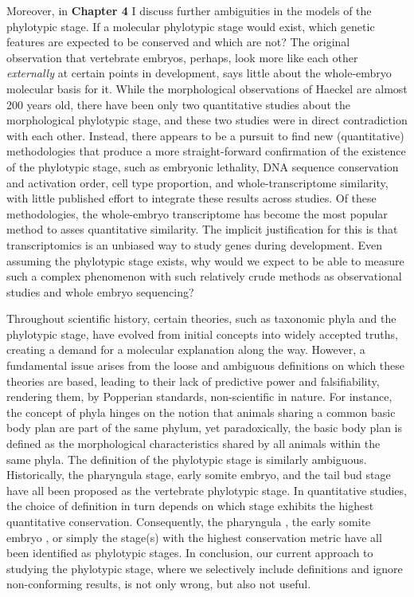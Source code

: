 Moreover, in \textbf{Chapter 4} I discuss further ambiguities in the models of the phylotypic stage. If a molecular phylotypic stage would exist, which genetic features are expected to be conserved and which are not? The original observation that vertebrate embryos, perhaps, look more like each other \textit{externally} at certain points in development, says little about the whole-embryo molecular basis for it. While the morphological observations of Haeckel are almost 200 years old, there have been only two quantitative studies about the morphological phylotypic stage, and these two studies were in direct contradiction with each other. Instead, there appears to be a pursuit to find new (quantitative) methodologies that produce a more straight-forward confirmation of the existence of the phylotypic stage, such as embryonic lethality\cite{Uchida2018},  DNA sequence conservation\cite{Piasecka2013,Quint2012,Liu2021} and activation order\cite{Uesaka2019}, cell type proportion\cite{Mayshar2023}, and whole-transcriptome similarity\cite{Piasecka2013,Irie2011,marletaz2018,Liu2020,Leong2021,PerezPosada2022,Kalinka2010}, with little published effort to integrate these results across studies. Of these methodologies, the whole-embryo transcriptome has become the most popular method to asses quantitative similarity. The implicit justification for this is that transcriptomics is an unbiased way to study genes during development. Even assuming the phylotypic stage exists, why would we expect to be able to measure such a complex phenomenon with such relatively crude methods as observational studies and whole embryo sequencing? 

Throughout scientific history, certain theories, such as taxonomic phyla and the phylotypic stage, have evolved from initial concepts into widely accepted truths, creating a demand for a molecular explanation along the way. However, a fundamental issue arises from the loose and ambiguous definitions on which these theories are based, leading to their lack of predictive power and falsifiability, rendering them, by Popperian standards, non-scientific in nature. For instance, the concept of phyla hinges on the notion that animals sharing a common basic body plan are part of the same phylum, yet paradoxically, the basic body plan is defined as the morphological characteristics shared by all animals within the same phyla\cite{BUDD2000,scholtz2004bauplane}. The definition of the phylotypic stage is similarly ambiguous. Historically, the pharyngula stage\cite{BALLARD1981}, early somite embryo\cite{Alberch1993}, and the tail bud stage \cite{Slack1993} have all been proposed as the vertebrate phylotypic stage. In quantitative studies, the choice of definition in turn depends on which stage exhibits the highest quantitative conservation. Consequently, the pharyngula \cite{Irie2011,marletaz2018}, the early somite embryo \cite{DomazetLoso2010}, or simply the stage(s) with the highest conservation metric\cite{Kalinka2010,Cordero2020} have all been identified as phylotypic stages. In conclusion, our current approach to studying the phylotypic stage, where we selectively include definitions and ignore non-conforming results, is not only wrong, but also not useful.


